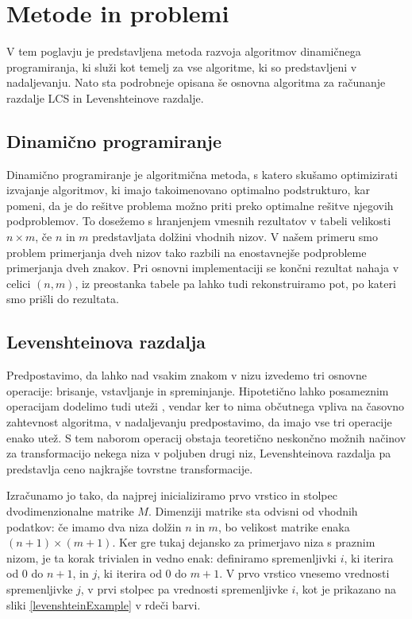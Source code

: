 \documentclass[a4paper,12pt,openright]{book}
\begin{document}
\chapter{Metode in problemi}

V tem poglavju je predstavljena metoda razvoja algoritmov dinamičnega programiranja, ki služi kot temelj za vse algoritme, ki so predstavljeni v nadaljevanju. Nato sta podrobneje opisana še osnovna algoritma za računanje razdalje LCS in Levenshteinove razdalje. 

\section{Dinamično programiranje}

Dinamično programiranje je algoritmična metoda, s katero skušamo optimizirati izvajanje algoritmov, ki imajo takoimenovano optimalno podstrukturo, kar pomeni, da je do rešitve problema možno priti preko optimalne rešitve njegovih podproblemov. To dosežemo s hranjenjem vmesnih rezultatov v tabeli velikosti $n \times m$, če $n$ in $m$ predstavljata dolžini vhodnih nizov. V našem primeru smo problem primerjanja dveh nizov tako razbili na enostavnejše podprobleme primerjanja dveh znakov. Pri osnovni implementaciji se končni rezultat nahaja v celici $(n,m)$, iz preostanka tabele pa lahko tudi rekonstruiramo pot, po kateri smo prišli do rezultata. 

\section{Levenshteinova razdalja}

Predpostavimo, da lahko nad vsakim znakom v nizu izvedemo tri osnovne operacije: brisanje, vstavljanje in spreminjanje. Hipotetično lahko posameznim operacijam dodelimo tudi uteži \cite{weightedLevenshtein}, vendar ker to nima občutnega vpliva na časovno zahtevnost algoritma, v nadaljevanju predpostavimo, da imajo vse tri operacije enako utež. S tem naborom operacij obstaja teoretično neskončno možnih načinov za transformacijo nekega niza v poljuben drugi niz, Levenshteinova razdalja pa predstavlja ceno najkrajše tovrstne transformacije. 

Izračunamo jo tako, da najprej inicializiramo prvo vrstico in stolpec dvodimenzionalne matrike $M$. Dimenziji matrike sta odvisni od vhodnih podatkov: če imamo dva niza dolžin $n$ in $m$, bo velikost matrike enaka $(n+1) \times (m+1)$. Ker gre tukaj dejansko za primerjavo niza s praznim nizom, je ta korak trivialen in vedno enak: definiramo spremenljivki $i$, ki iterira od 0 do $n+1$, in $j$, ki iterira od 0 do $m+1$. V prvo vrstico vnesemo vrednosti spremenljivke $j$, v prvi stolpec pa vrednosti spremenljivke $i$, kot je prikazano na sliki \ref{levenshteinExample} v rdeči barvi. 
\end{document}
